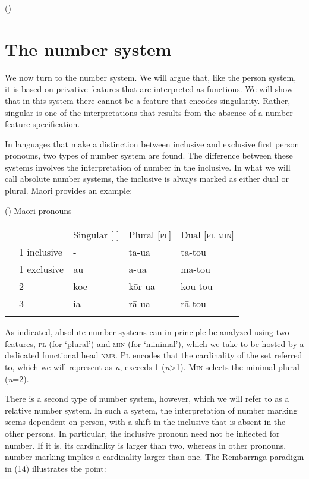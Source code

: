 \documentclass[output=paper]{langsci/langscibook}
\begin{document}
 

(\label{bkm:Ref295390383})

\section{The number system}

We now turn to the number system. We will argue that, like the person system, it is based on privative features that are interpreted as functions. We will show that in this system there cannot be a feature that encodes singularity. Rather, singular is one of the interpretations that results from the absence of a number feature specification.

  In languages that make a distinction between inclusive and exclusive first person pronouns, two types of number system are found. The difference between these systems involves the interpretation of number in the inclusive. In what we will call absolute number systems, the inclusive is always marked as either dual or plural. Maori provides an example: 

(\label{bkm:Ref328732387})    Maori pronouns

\begin{tabularx}{\textwidth}{XXXXX} 
\lsptoprule
&  & Singular [ ] & Plural [\textsc{pl}] & Dual [\textsc{pl} \textsc{min}]\\
& 1 inclusive & {}- & t\=a-ua & t\=a-tou\\
& 1 exclusive & au & \=a-ua & m\=a-tou\\
& 2 & koe & k\=or-ua & kou-tou\\
& 3 & ia & r\=a-ua & r\=a-tou\\
\lspbottomrule
\end{tabularx}

As indicated, absolute number systems can in principle be analyzed using two features, \textsc{pl} (for ‘plural’) and \textsc{min} (for ‘minimal’), which we take to be hosted by a dedicated functional head \textsc{nmb}. \textsc{Pl} encodes that the cardinality of the set referred to, which we will represent as \textit{n}, exceeds 1 (\textit{n}>1). \textsc{Min} selects the minimal plural (\textit{n}=2).

There is a second type of number system, however, which we will refer to as a relative number system. In such a system, the interpretation of number marking seems dependent on person, with a shift in the inclusive that is absent in the other persons. In particular, the inclusive pronoun need not be inflected for number. If it is, its cardinality is larger than two, whereas in other pronouns, number marking implies a cardinality larger than one. The Rembarrnga paradigm in (14) illustrates the point:
\end{document}
